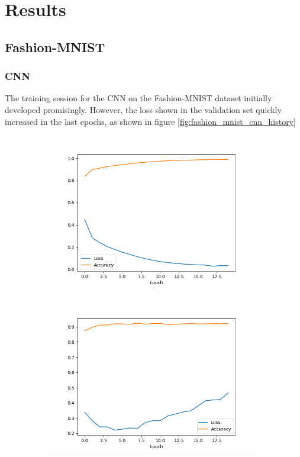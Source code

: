 \documentclass[../main.tex]{subfiles}
\begin{document}
\section{Results}

\subsection{Fashion-MNIST}
\subsubsection{CNN}
The training session for the CNN on the Fashion-MNIST dataset initially developed promisingly. However, the loss shown in the validation set quickly increased in the last epochs, as shown in figure \ref{fig:fashion_mnist_cnn_history}

\begin{figure}[H]
    \begin{subfigure}{.5\textwidth}
        \centering
        \includegraphics[width=1.1\linewidth]{assets/fashion_mnist_train_history.png}
    \end{subfigure}
    \begin{subfigure}{.5\textwidth}
        \centering
        \includegraphics[width=1.1\linewidth]{assets/fashion_mnist_val_history.png}

\end{subfigure}
\end{figure}
\end{document}
